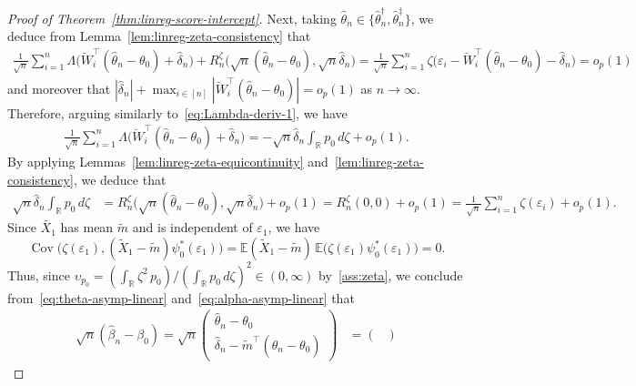 \documentclass[a4paper]{article}
\newcommand{\R}{\mathbb{R}}
\newcommand{\E}{\mathbb{E}}
\DeclareMathOperator\Cov{Cov}
\theoremstyle{definition}
\begin{document}
\begin{proof}[Proof of Theorem~\ref{thm:linreg-score-intercept}]
Next, taking $\hat{\theta}_n \in \{\hat{\theta}_n^\dagger,\hat{\theta}_n^\ddagger\}$, we deduce from Lemma~\ref{lem:linreg-zeta-consistency} that
\begin{align*}
\frac{1}{\sqrt{n}}\sum_{i=1}^n \Lambda\bigl(\breve{W}_i^\top(\hat{\theta}_n - \theta_0) + \hat{\delta}_n\bigr) + R_n^\zeta\bigl(\sqrt{n}(\hat{\theta}_n - \theta_0),\sqrt{n}\hat{\delta}_n\bigr) = \frac{1}{\sqrt{n}}\sum_{i=1}^n \zeta\bigl(\varepsilon_i - \breve{W}_i^\top(\hat{\theta}_n - \theta_0) - \hat{\delta}_n\bigr) = o_p(1)
\end{align*}
and moreover that $|\hat{\delta}_n| + \max_{i \in [n]}|\breve{W}_i^\top(\hat{\theta}_n - \theta_0)| = o_p(1)$ as $n \to \infty$. Therefore, arguing similarly to~\eqref{eq:Lambda-deriv-1}, we have
\begin{align*}
\frac{1}{\sqrt{n}}\sum_{i=1}^n \Lambda\bigl(\breve{W}_i^\top(\hat{\theta}_n - \theta_0) + \hat{\delta}_n\bigr) 
= -\sqrt{n}\hat{\delta}_n\int_\R p_0\,d\zeta + o_p(1).
\end{align*}
By applying Lemmas~\ref{lem:linreg-zeta-equicontinuity} and~\ref{lem:linreg-zeta-consistency}, we deduce that
\begin{align}
\label{eq:alpha-asymp-linear}
\sqrt{n}\hat{\delta}_n\int_\R p_0\,d\zeta &= R_n^\zeta\bigl(\sqrt{n}(\hat{\theta}_n - \theta_0), \sqrt{n}\hat{\delta}_n\bigr) + o_p(1) = R_n^\zeta(0,0) + o_p(1) = \frac{1}{\sqrt{n}}\sum_{i=1}^n \zeta(\varepsilon_i) + o_p(1).
\end{align}
Since $\tilde{X_1}$ has mean $\tilde{m}$ and is independent of $\varepsilon_1$, we have 
\[
\Cov\bigl(\zeta(\varepsilon_1),(\tilde{X}_1 - \tilde{m})\psi_0^*(\varepsilon_1)\bigr) = \E(\tilde{X}_1 - \tilde{m})\,\E\bigl(\zeta(\varepsilon_1)\psi_0^*(\varepsilon_1)\bigr) = 0.
\]
Thus, since $\upsilon_{p_0} = (\int_\R \zeta^2\,p_0)/(\int_\R p_0\,d\zeta)^2 \in (0,\infty)$ by~\ref{ass:zeta}, we conclude  from~\eqref{eq:theta-asymp-linear} and~\eqref{eq:alpha-asymp-linear} that
\begin{align*}
\sqrt{n}(\hat{\beta}_n - \beta_0) = 
\sqrt{n}\begin{pmatrix}
\hat{\theta}_n - \theta_0 \\
\hat{\delta}_n - \tilde{m}^\top(\hat{\theta}_n - \theta_0)
\end{pmatrix}
&= \begin{pmatrix}

\end{pmatrix}
\end{align*}
\end{proof}
\end{document}
